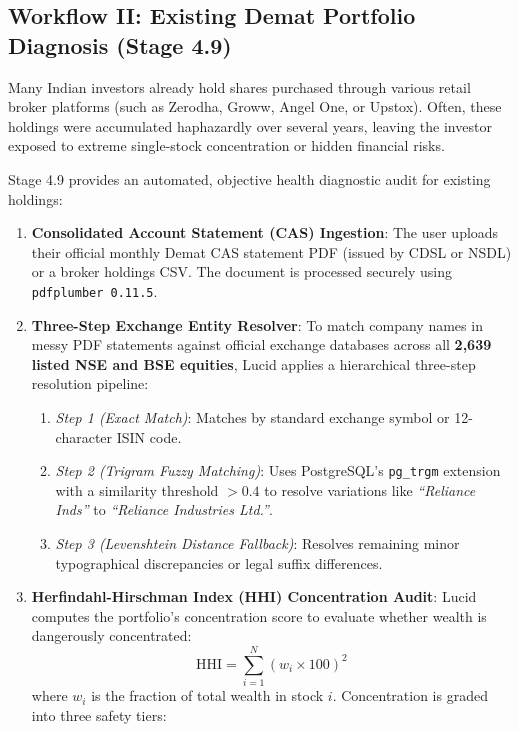 \subsection{Workflow II: Existing Demat Portfolio Diagnosis (Stage 4.9)}
Many Indian investors already hold shares purchased through various retail broker platforms (such as Zerodha, Groww, Angel One, or Upstox). Often, these holdings were accumulated haphazardly over several years, leaving the investor exposed to extreme single-stock concentration or hidden financial risks.

Stage 4.9 provides an automated, objective health diagnostic audit for existing holdings:
\begin{enumerate}
    \item \textbf{Consolidated Account Statement (CAS) Ingestion}: The user uploads their official monthly Demat CAS statement PDF (issued by CDSL or NSDL) or a broker holdings CSV. The document is processed securely using \texttt{pdfplumber 0.11.5}.
    \item \textbf{Three-Step Exchange Entity Resolver}: To match company names in messy PDF statements against official exchange databases across all \textbf{2,639 listed NSE and BSE equities}, Lucid applies a hierarchical three-step resolution pipeline:
    \begin{enumerate}
        \item \textit{Step 1 (Exact Match)}: Matches by standard exchange symbol or 12-character ISIN code.
        \item \textit{Step 2 (Trigram Fuzzy Matching)}: Uses PostgreSQL's \texttt{pg\_trgm} extension with a similarity threshold $> 0.4$ to resolve variations like \textit{``Reliance Inds''} to \textit{``Reliance Industries Ltd.''}.
        \item \textit{Step 3 (Levenshtein Distance Fallback)}: Resolves remaining minor typographical discrepancies or legal suffix differences.
    \end{enumerate}
    \item \textbf{Herfindahl-Hirschman Index (HHI) Concentration Audit}:
    Lucid computes the portfolio's concentration score to evaluate whether wealth is dangerously concentrated:
    \begin{equation}
    \text{HHI} = \sum_{i=1}^{N} (w_i \times 100)^2
    \end{equation}
    where $w_i$ is the fraction of total wealth in stock $i$. Concentration is graded into three safety tiers:
    \begin{itemize}

\end{itemize}
\end{enumerate}
